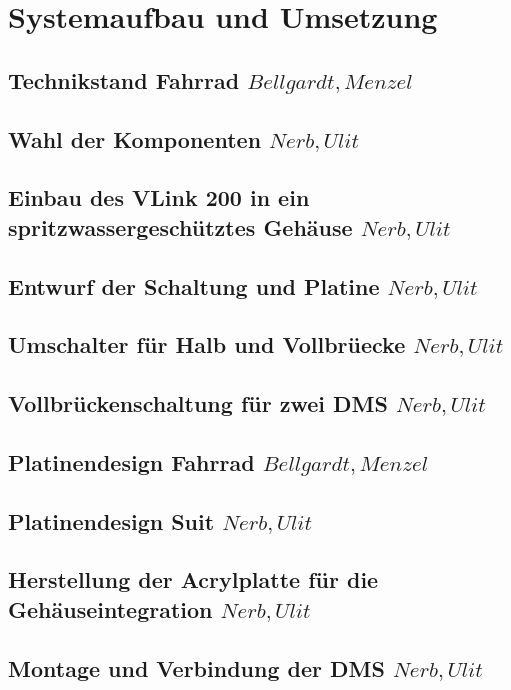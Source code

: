 \chapter{Systemaufbau und Umsetzung}

\section{Technikstand Fahrrad \(Bellgardt, Menzel\)}
\section{Wahl der Komponenten \(Nerb, Ulit\)}


\section{Einbau des V\-Link 200 in ein spritzwassergesch\"utztes Geh\"ause \(Nerb, Ulit\)}
\section{Entwurf der Schaltung und Platine \(Nerb, Ulit\)}
\section{Umschalter f\"ur Halb\- und Vollbr\"uecke \(Nerb, Ulit\)}
\section{Vollbr\"uckenschaltung f\"ur zwei DMS \(Nerb, Ulit\)}
\section{Platinendesign Fahrrad \(Bellgardt, Menzel\)}
\section{Platinendesign Suit \(Nerb, Ulit\)}
\section{Herstellung der Acrylplatte f\"ur die Geh\"auseintegration \(Nerb, Ulit\)}
\section{Montage und Verbindung der DMS \(Nerb, Ulit\)}
